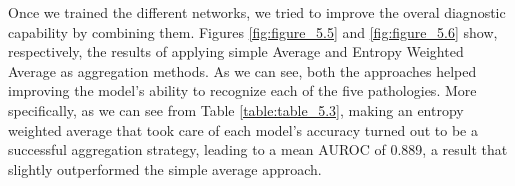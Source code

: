 \begin{table}[h!]
\centering
{}
\caption[\acp{CNN} AUROC results]{AUROC values obtained with the \acp{CNN} indicated in the \textbf{Model} column.}
\label{table:table_5.2}
\end{table}

Once we trained the different networks, we tried to improve the overal diagnostic capability by combining them. Figures \ref{fig:figure_5.5} and \ref{fig:figure_5.6} show, respectively, the results of applying simple Average and Entropy Weighted Average as aggregation methods.  As we can see, both the approaches helped improving the model's ability to recognize each of the five pathologies. More specifically, as we can see from Table \ref{table:table_5.3}, making an entropy weighted average that took care of each model's accuracy turned out to be a successful aggregation strategy, leading to a mean \ac{AUROC} of 0.889, a result that slightly outperformed the simple average approach. 



